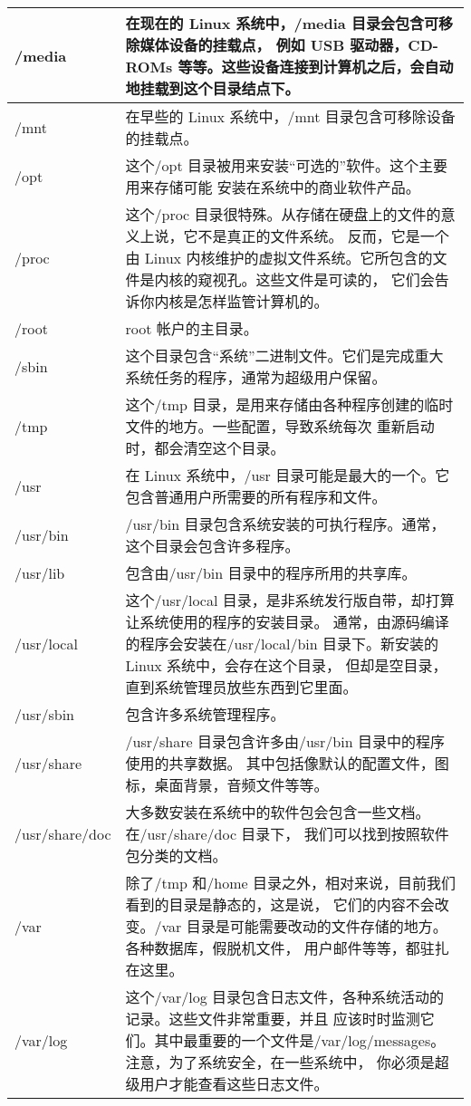 \begin{center}
\begin{supertabular}{p{2.cm}p{13cm}}
\midrule/media & 在现在的 Linux 系统中，/media 目录会包含可移除媒体设备的挂载点， 例如 USB 驱动器，CD-ROMs 等等。这些设备连接到计算机之后，会自动地挂载到这个目录结点下。 \\
\midrule/mnt & 在早些的 Linux 系统中，/mnt 目录包含可移除设备的挂载点。\\
\midrule /opt & 这个/opt 目录被用来安装“可选的”软件。这个主要用来存储可能 安装在系统中的商业软件产品。\\
\midrule/proc & 这个/proc 目录很特殊。从存储在硬盘上的文件的意义上说，它不是真正的文件系统。 反而，它是一个由 Linux 内核维护的虚拟文件系统。它所包含的文件是内核的窥视孔。这些文件是可读的， 它们会告诉你内核是怎样监管计算机的。\\
\midrule /root & root 帐户的主目录。\\
\midrule /sbin & 这个目录包含“系统”二进制文件。它们是完成重大系统任务的程序，通常为超级用户保留。\\
\midrule /tmp & 这个/tmp 目录，是用来存储由各种程序创建的临时文件的地方。一些配置，导致系统每次 重新启动时，都会清空这个目录。\\
\midrule /usr & 在 Linux 系统中，/usr 目录可能是最大的一个。它包含普通用户所需要的所有程序和文件。\\
\midrule /usr/bin & /usr/bin 目录包含系统安装的可执行程序。通常，这个目录会包含许多程序。\\
\midrule /usr/lib & 包含由/usr/bin 目录中的程序所用的共享库。\\
\midrule /usr/local & 这个/usr/local 目录，是非系统发行版自带，却打算让系统使用的程序的安装目录。 通常，由源码编译的程序会安装在/usr/local/bin 目录下。新安装的 Linux 系统中，会存在这个目录， 但却是空目录，直到系统管理员放些东西到它里面。\\
\midrule /usr/sbin & 包含许多系统管理程序。\\
\midrule /usr/share & /usr/share 目录包含许多由/usr/bin 目录中的程序使用的共享数据。 其中包括像默认的配置文件，图标，桌面背景，音频文件等等。\\
\midrule /usr/share/doc & 大多数安装在系统中的软件包会包含一些文档。在/usr/share/doc 目录下， 我们可以找到按照软件包分类的文档。\\
\midrule /var & 除了/tmp 和/home 目录之外，相对来说，目前我们看到的目录是静态的，这是说， 它们的内容不会改变。/var 目录是可能需要改动的文件存储的地方。各种数据库，假脱机文件， 用户邮件等等，都驻扎在这里。\\
\midrule /var/log & 这个/var/log 目录包含日志文件，各种系统活动的记录。这些文件非常重要，并且 应该时时监测它们。其中最重要的一个文件是/var/log/messages。注意，为了系统安全，在一些系统中， 你必须是超级用户才能查看这些日志文件。\\

\end{supertabular}
\end{center}





